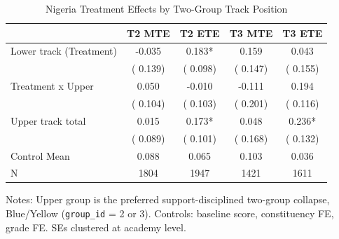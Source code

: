 \begin{table}[!htbp]
\centering
\caption{Nigeria Treatment Effects by Two-Group Track Position}
\label{tab:ng_upper_lower}
\begin{threeparttable}
\begin{tabular}[t]{lcccc}
\toprule
 & T2 MTE & T2 ETE & T3 MTE & T3 ETE \\
\midrule
Lower track (Treatment) &  -0.035 &   0.183* &   0.159 &   0.043 \\
 & (  0.139) & (  0.098) & (  0.147) & (  0.155) \\
Treatment x Upper &   0.050 &  -0.010 &  -0.111 &   0.194 \\
 & (  0.104) & (  0.103) & (  0.201) & (  0.116) \\
Upper track total &   0.015 &   0.173* &   0.048 &   0.236* \\
 & (  0.089) & (  0.101) & (  0.168) & (  0.132) \\
\addlinespace
Control Mean &   0.088 &   0.065 &   0.103 &   0.036 \\
N & 1804 & 1947 & 1421 & 1611 \\
\bottomrule
\end{tabular}
\begin{tablenotes}[para]
\item Notes: Upper group is the preferred support-disciplined two-group collapse, Blue/Yellow (\texttt{group\_id} = 2 or 3). Controls: baseline score, constituency FE, grade FE. SEs clustered at academy level.
\end{tablenotes}
\end{threeparttable}
\end{table}
